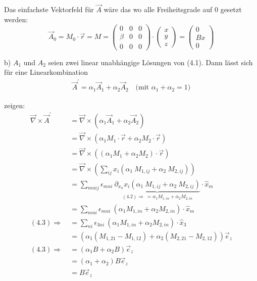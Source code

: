 \documentclass[11pt a4paper]{article}
\begin{document}
Das einfachste Vektorfeld für $\vec A$ wäre das wo alle Freiheitsgrade auf 
0 gesetzt werden:
\[
	\vec A_0 = M_0 \cdot \vec r = 
	M = \begin{pmatrix}
		0 &0 &0 \\ \beta &0 &0 \\ 0 &0 &0
	\end{pmatrix}
	\cdot \begin{pmatrix}
		x \\ y \\ z
	\end{pmatrix}
	= 
	\begin{pmatrix}
		0 \\ Bx \\0
	\end{pmatrix}
\]


b) $A_1$ und $A_2$ seien zwei linear unabhängige Lösungen von (4.1). Dann 
lässt sich für eine Linearkombination 
\begin{align*}
	\vec A^\prime = \alpha_1 \vec A_1 + \alpha_2 \vec A_2
	\quad \text{(mit $\alpha_1 + \alpha_2 = 1$)}
\end{align*}

zeigen:
\begin{align*}
	\vec \nabla \times \vec A^\prime
	&= \vec \nabla \times \left(
		\alpha_1 \vec A_1 + \alpha_2 \vec A_2
	\right) \\
	&= \vec \nabla \times \left(
		\alpha_1 M_1 \cdot \vec r + \alpha_2 M_2 \cdot \vec r
	\right) \\
	&= \vec \nabla \times \left(
		(\alpha_1 M_1 + \alpha_2 M_2) \cdot \vec r
	\right) \\
	&= \vec \nabla \times \left(
		\sum_{i j} x_i (\alpha_1 \ M_{1, ij} + 
		\alpha_2 \ M_{2, ij})
	\right) \\ 
	&= \sum_{m n i j} \epsilon_{mni} \  \underbrace{\partial_{x_n} x_i 
	(\alpha_1 \ M_{1, ij} + \alpha_2 \ M_{2, ij})}_{
		(4.2) \Rightarrow \ =\alpha_1 M_{1, in} 
		+ \alpha_2 M_{2, in}}
	\cdot \hat x_m \\[0.1cm]
	&= \sum_{m n i} \epsilon_{mni} \
		\left( \alpha_1 M_{1, in} + \alpha_2 M_{2, in} \right)
	\cdot \hat x_m \\
	(4.3) \Rightarrow \ 
	&= \sum_{n i} \epsilon_{3ni} \
		\left( \alpha_1 M_{1, in} + \alpha_2 M_{2, in} \right)
	\cdot \hat x_3 \\
	&= \left( \alpha_1 (M_{1,21} - M_{1,12}) + \alpha_2
		(M_{2,21} - M_{2,12}) \right) \vec e_z \\
	(4.3) \Rightarrow \ 
	&= \left( \alpha_1 B + \alpha_2 B \right) \vec e_z \\
	&= \left( \alpha_1 + \alpha_2 \right) B \vec e_z \\
	&= B \vec e_z
\end{align*}
\end{document}

